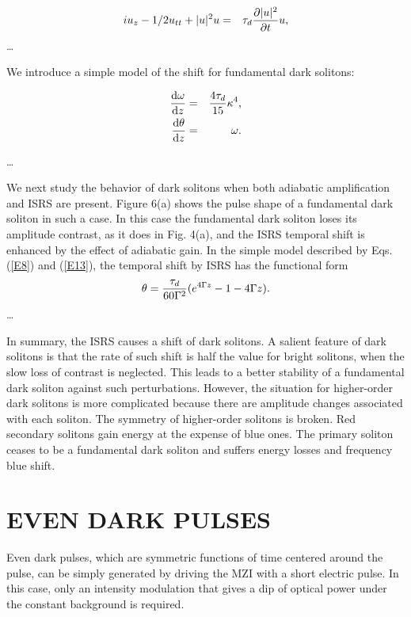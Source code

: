 \begin{eqnarray}
iu_z - {1/2}u_{tt}+|u|^2u &=& \tau_d{\partial |u|^2 \over \partial t}u,
\label{E12}
\end{eqnarray}
\ldots

We introduce a simple model of the shift for fundamental dark solitons:
\begin{mathletters}
\begin{eqnarray}
{{\rm d}\omega \over {\rm d}z}  &=& {4\tau_d \over 15}\kappa^4,
\label{E13}\\
{{\rm d}\theta \over {\rm d}z}  &=& \omega.
\label{E14}
\end{eqnarray}
\end{mathletters}
\ldots



We next study the behavior of dark solitons when both adiabatic
amplification and ISRS are present. Figure 6(a) shows the pulse shape of a
fundamental dark soliton in such a case.  In this case the fundamental dark
soliton loses its amplitude contrast, as it does in Fig. 4(a), and the ISRS
temporal shift is enhanced by the effect of adiabatic gain. In the simple
model described by Eqs. (\ref{E8}) and (\ref{E13}), the temporal shift by
ISRS has the functional form
\begin{eqnarray}
\theta  =  {\tau_d \over 60 \Gamma^2 } ( e^{ 4 \Gamma z } - 1 - 4
\Gamma z ) .             \label{E15}
\end{eqnarray}
\ldots

In summary, the ISRS causes a shift of dark solitons.  A salient feature of
dark solitons is that the rate of such shift is half the value for bright
solitons, when the slow loss of contrast is neglected.  This leads to a
better stability of a fundamental dark soliton against such perturbations.
However, the situation for higher-order dark solitons is more complicated
because there are amplitude changes associated with each soliton.  The
symmetry of higher-order solitons is broken.  Red secondary solitons gain
energy at the expense of blue ones. The primary soliton ceases to be a
fundamental dark soliton and suffers energy losses and frequency blue
shift.


\section{EVEN  DARK PULSES}
\label{EDP}
Even dark pulses,\cite{KA,WA} which are symmetric functions of time
centered around the pulse, can be simply generated by driving the MZI with
a short electric pulse.  In this case, only an intensity modulation that
gives a dip of optical power under the constant background is required.

